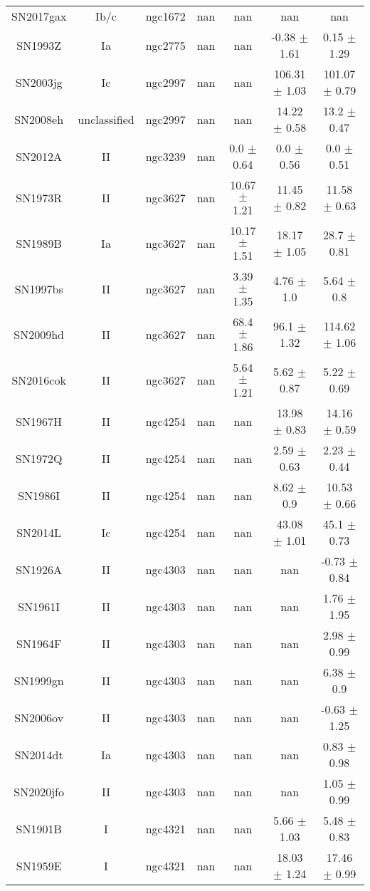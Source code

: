 \begin{table}
\begin{tabular}{ccccccc}
SN2017gax & Ib/c & ngc1672 & nan & nan & nan & nan \\
SN1993Z & Ia & ngc2775 & nan & nan & -0.38 $\pm$ 1.61 & 0.15 $\pm$ 1.29 \\
SN2003jg & Ic & ngc2997 & nan & nan & 106.31 $\pm$ 1.03 & 101.07 $\pm$ 0.79 \\
SN2008eh & unclassified & ngc2997 & nan & nan & 14.22 $\pm$ 0.58 & 13.2 $\pm$ 0.47 \\
SN2012A & II & ngc3239 & nan & 0.0 $\pm$ 0.64 & 0.0 $\pm$ 0.56 & 0.0 $\pm$ 0.51 \\
SN1973R & II & ngc3627 & nan & 10.67 $\pm$ 1.21 & 11.45 $\pm$ 0.82 & 11.58 $\pm$ 0.63 \\
SN1989B & Ia & ngc3627 & nan & 10.17 $\pm$ 1.51 & 18.17 $\pm$ 1.05 & 28.7 $\pm$ 0.81 \\
SN1997bs & II & ngc3627 & nan & 3.39 $\pm$ 1.35 & 4.76 $\pm$ 1.0 & 5.64 $\pm$ 0.8 \\
SN2009hd & II & ngc3627 & nan & 68.4 $\pm$ 1.86 & 96.1 $\pm$ 1.32 & 114.62 $\pm$ 1.06 \\
SN2016cok & II & ngc3627 & nan & 5.64 $\pm$ 1.21 & 5.62 $\pm$ 0.87 & 5.22 $\pm$ 0.69 \\
SN1967H & II & ngc4254 & nan & nan & 13.98 $\pm$ 0.83 & 14.16 $\pm$ 0.59 \\
SN1972Q & II & ngc4254 & nan & nan & 2.59 $\pm$ 0.63 & 2.23 $\pm$ 0.44 \\
SN1986I & II & ngc4254 & nan & nan & 8.62 $\pm$ 0.9 & 10.53 $\pm$ 0.66 \\
SN2014L & Ic & ngc4254 & nan & nan & 43.08 $\pm$ 1.01 & 45.1 $\pm$ 0.73 \\
SN1926A & II & ngc4303 & nan & nan & nan & -0.73 $\pm$ 0.84 \\
SN1961I & II & ngc4303 & nan & nan & nan & 1.76 $\pm$ 1.95 \\
SN1964F & II & ngc4303 & nan & nan & nan & 2.98 $\pm$ 0.99 \\
SN1999gn & II & ngc4303 & nan & nan & nan & 6.38 $\pm$ 0.9 \\
SN2006ov & II & ngc4303 & nan & nan & nan & -0.63 $\pm$ 1.25 \\
SN2014dt & Ia & ngc4303 & nan & nan & nan & 0.83 $\pm$ 0.98 \\
SN2020jfo & II & ngc4303 & nan & nan & nan & 1.05 $\pm$ 0.99 \\
SN1901B & I & ngc4321 & nan & nan & 5.66 $\pm$ 1.03 & 5.48 $\pm$ 0.83 \\
SN1959E & I & ngc4321 & nan & nan & 18.03 $\pm$ 1.24 & 17.46 $\pm$ 0.99 \\

\end{tabular}
\end{table}
